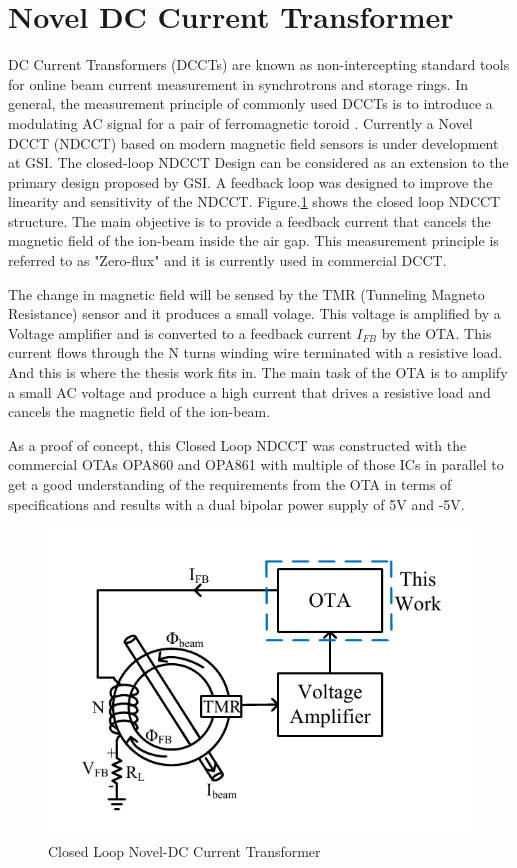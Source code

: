 \vfill
\clearpage

\section{Novel DC Current Transformer}

DC Current Transformers (DCCTs) are known as  non-intercepting  standard  tools  for online beam current measurement in synchrotrons and storage rings. In general, the measurement principle of commonly used DCCTs is to introduce a modulating AC signal for a pair of ferromagnetic toroid \cite{ndcct_gsi}. Currently a Novel DCCT (NDCCT) based on modern magnetic field sensors is under development at GSI. The closed-loop NDCCT Design can be considered as an extension to the primary design proposed by GSI. A feedback loop was designed to improve the linearity and sensitivity of the NDCCT. Figure.\ref{fig:HRDCCT} shows the closed loop NDCCT structure\cite{hrdcct}. The main objective is to provide a feedback current that cancels the magnetic field of the ion-beam inside the air gap. This measurement principle is referred to as "Zero-flux" and it is currently used in commercial DCCT.

The change in magnetic field will be sensed by the TMR (Tunneling Magneto Resistance) sensor and it produces a small volage. This voltage is amplified by a Voltage amplifier and is converted to a feedback current $I_{FB}$ by the OTA. This current flows through the N turns winding wire terminated with a resistive load. And this is where the thesis work fits in. The main task of the OTA is to amplify a small AC voltage and produce a high current that drives a resistive load and cancels the magnetic field of the ion-beam.

As a proof of concept, this Closed Loop NDCCT was constructed with the commercial OTAs OPA860 and OPA861 with multiple of those ICs in parallel to get a good understanding of the requirements from the OTA in terms of specifications and results with a dual bipolar power supply of 5V and -5V.

\begin{figure} [H]
\centering
\includegraphics[scale=1]{Figures/System_Level/HRDCCT.pdf}
\caption{Closed Loop Novel-DC Current Transformer}
\label{fig:HRDCCT}
\end{figure}

